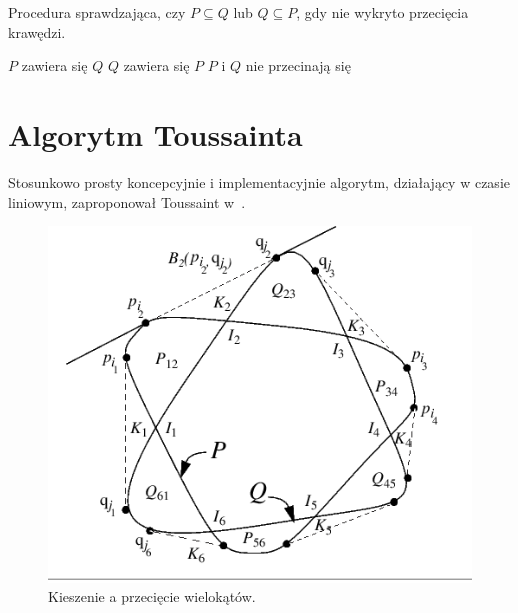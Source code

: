 \begin{algorithm}
  \caption{\label{alg:OrourkeFinalTerms} Procedura sprawdzająca, czy
    $P \subseteq Q$ lub $Q \subseteq P$, gdy nie wykryto przecięcia
    krawędzi.}
  \begin{algorithmic}[1]
    \State $P$ zawiera się $Q$
    \Else
    \State $Q$ zawiera się $P$
    \Else
    \State $P$ i $Q$ nie przecinają się
    \EndIf
    \EndIf
  \end{algorithmic}
\end{algorithm}

\section{Algorytm Toussainta}
Stosunkowo prosty koncepcyjnie i implementacyjnie algorytm, działający
w czasie liniowym, zaproponował Toussaint w~\cite{ToussaintInt}.

\begin{figure}[htb]
  \centering
  \includegraphics[scale=0.7]{img/toussaint1}
  \caption{\label{img:toussaint1} Kieszenie a przecięcie wielokątów.}
\end{figure}

